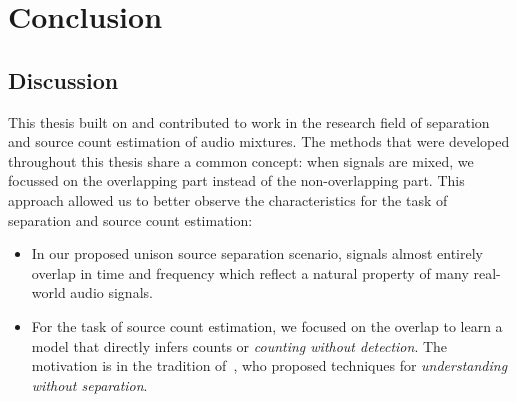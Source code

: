 \chapter{Conclusion}%
\label{cha:conclusion}



\section{Discussion}
This thesis built on and contributed to work in the research field of separation and source count estimation of audio mixtures. The methods that were developed throughout this thesis share a common concept: when signals are mixed, we focussed on the overlapping part instead of the non-overlapping part. 
This approach allowed us to better observe the characteristics for the task of separation and source count estimation:

\begin{itemize}
  \item In our proposed unison source separation scenario, signals almost entirely overlap in time and frequency which reflect a natural property of many real-world audio signals.
  \item For the task of source count estimation, we focused on the overlap to learn a model that directly infers counts or \emph{counting without detection}. The motivation is in the tradition of~\cite{scheirer99}, who proposed techniques for \emph{understanding without separation}.
\end{itemize}

